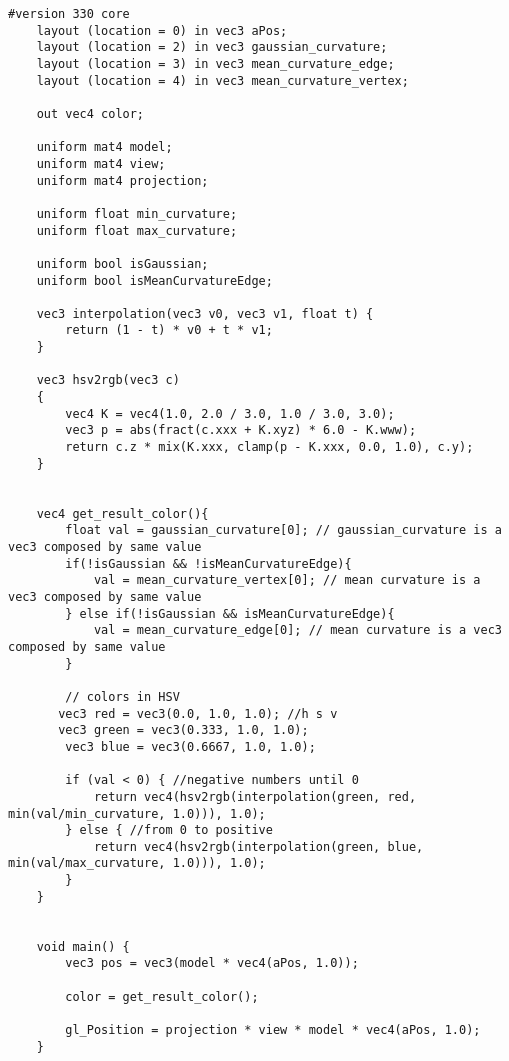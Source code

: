 \begin{lstlisting}[caption={Vertex Shader for constant/Gouraud Gaussian curvature and constant/Gouraud mean curvature (Sections: \ref{section:gc-curvature} and \ref{section:mc-curvature})}]
    #version 330 core
    layout (location = 0) in vec3 aPos;
    layout (location = 2) in vec3 gaussian_curvature;
    layout (location = 3) in vec3 mean_curvature_edge;
    layout (location = 4) in vec3 mean_curvature_vertex;

    out vec4 color;

    uniform mat4 model;
    uniform mat4 view;
    uniform mat4 projection;

    uniform float min_curvature;
    uniform float max_curvature;

    uniform bool isGaussian;
    uniform bool isMeanCurvatureEdge;

    vec3 interpolation(vec3 v0, vec3 v1, float t) {
        return (1 - t) * v0 + t * v1;
    }

    vec3 hsv2rgb(vec3 c)
    {
        vec4 K = vec4(1.0, 2.0 / 3.0, 1.0 / 3.0, 3.0);
        vec3 p = abs(fract(c.xxx + K.xyz) * 6.0 - K.www);
        return c.z * mix(K.xxx, clamp(p - K.xxx, 0.0, 1.0), c.y);
    }


    vec4 get_result_color(){
        float val = gaussian_curvature[0]; // gaussian_curvature is a vec3 composed by same value
        if(!isGaussian && !isMeanCurvatureEdge){
            val = mean_curvature_vertex[0]; // mean curvature is a vec3 composed by same value
        } else if(!isGaussian && isMeanCurvatureEdge){
            val = mean_curvature_edge[0]; // mean curvature is a vec3 composed by same value
        }

        // colors in HSV
       vec3 red = vec3(0.0, 1.0, 1.0); //h s v
       vec3 green = vec3(0.333, 1.0, 1.0);
        vec3 blue = vec3(0.6667, 1.0, 1.0);

        if (val < 0) { //negative numbers until 0
            return vec4(hsv2rgb(interpolation(green, red, min(val/min_curvature, 1.0))), 1.0);
        } else { //from 0 to positive
            return vec4(hsv2rgb(interpolation(green, blue, min(val/max_curvature, 1.0))), 1.0);
        }
    }


    void main() {
        vec3 pos = vec3(model * vec4(aPos, 1.0));

        color = get_result_color();

        gl_Position = projection * view * model * vec4(aPos, 1.0);
    }
\end{lstlisting}

